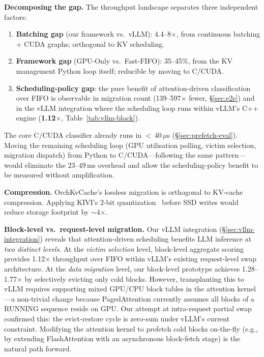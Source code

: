 \documentclass[conference]{IEEEtran}
\begin{document}
\textbf{Decomposing the gap.} The throughput landscape separates three independent factors:
\begin{enumerate}
\item \textbf{Batching gap} (our framework vs.\ vLLM): 4.4--8$\times$, from continuous batching + CUDA graphs; orthogonal to KV scheduling.
\item \textbf{Framework gap} (GPU-Only vs.\ Fast-FIFO): 35--45\%, from the KV management Python loop itself; reducible by moving to C/CUDA.
\item \textbf{Scheduling-policy gap}: the pure benefit of attention-driven classification over FIFO is observable in migration count (139--597$\times$ fewer, \S\ref{sec:e2e}) and in the vLLM integration where the scheduling loop runs within vLLM's C++ engine (\textbf{1.12$\times$}, Table~\ref{tab:vllm-block}).
\end{enumerate}

The core C/CUDA classifier already runs in $<$\,40\,$\mu$s (\S\ref{sec:prefetch-eval}).  Moving the remaining scheduling loop (GPU utilisation polling, victim selection, migration dispatch) from Python to C/CUDA---following the same pattern---would eliminate the 23--49\,ms overhead and allow the scheduling-policy benefit to be measured without amplification.

\textbf{Compression.} OrchKvCache's lossless migration is orthogonal to KV-cache compression. Applying KIVI's 2-bit quantization~\cite{kivi} before SSD writes would reduce storage footprint by ${\sim}$4$\times$.

\textbf{Block-level vs.\ request-level migration.}
\label{sec:discussion}
Our vLLM integration (\S\ref{sec:vllm-integration}) reveals that attention-driven scheduling benefits LLM inference at \emph{two distinct levels}. At the \emph{victim selection} level, block-level aggregate scoring provides 1.12$\times$ throughput over FIFO within vLLM's existing request-level swap architecture. At the \emph{data migration} level, our block-level prototype achieves 1.28--1.77$\times$ by selectively evicting only cold blocks. However, transplanting this to vLLM requires supporting mixed GPU/CPU block tables in the attention kernel---a non-trivial change because PagedAttention currently assumes all blocks of a RUNNING sequence reside on GPU. Our attempt at intra-request partial swap confirmed this: the evict-restore cycle is zero-sum under vLLM's current constraint. Modifying the attention kernel to prefetch cold blocks on-the-fly (e.g., by extending FlashAttention with an asynchronous block-fetch stage) is the natural path forward.
\end{document}
